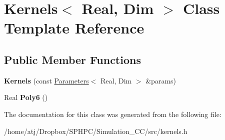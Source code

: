 \hypertarget{classKernels}{}\section{Kernels$<$ Real, Dim $>$ Class Template Reference}
\label{classKernels}
\subsection*{Public Member Functions}
\begin{DoxyCompactItemize}
\item 
\hypertarget{classKernels_a624c777a16ae45da518cded92949c9c6}{}{\bfseries Kernels} (const \hyperlink{classParameters}{Parameters}$<$ Real, Dim $>$ \&params)\label{classKernels_a624c777a16ae45da518cded92949c9c6}

\item 
\hypertarget{classKernels_a6656e4a55980d231b057e42c79ae2093}{}Real {\bfseries Poly6} ()\label{classKernels_a6656e4a55980d231b057e42c79ae2093}

\end{DoxyCompactItemize}


The documentation for this class was generated from the following file\+:\begin{DoxyCompactItemize}
\item 
/home/atj/\+Dropbox/\+S\+P\+H\+P\+C/\+Simulation\+\_\+\+C\+C/src/kernels.\+h\end{DoxyCompactItemize}
